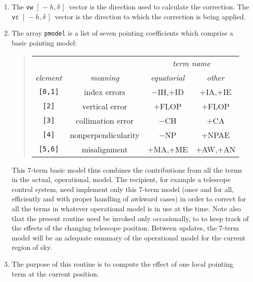 \documentclass[12pt,fleqn,twoside]{article}
\renewcommand{\_}{{\tt\char'137}}     %
\newcommand{\mhadec}     {$[\,-h,\delta\,]$}
\begin{document}
{\begin{enumerate}
\begin{itemize}
      \end{itemize}
\item The {\tt vw} \mhadec\ vector is the direction used to calculate the
      correction.
      The {\tt vc} \mhadec\ vector is the direction to which the correction
      is being applied.
\item The array {\tt pmodel} is a list of seven pointing coefficients
      which comprise a basic pointing model:
      \begin{quote}
      \begin{tabular}{cccc}
      & & \multicolumn{2}{c}{\it term name} \\
      {\it element} & {\it meaning} & {\it equatorial} & {\it other} \\[1ex]
      {\tt [0,1]} & index errors & $-$IH,$+$ID & $+$IA,$+$IE \\
      {\tt [2]} & vertical error & $+$FLOP & $+$FLOP \\
      {\tt [3]} & collimation error & $-$CH & $+$CA \\
      {\tt [4]} & nonperpendicularity & $-$NP & $+$NPAE \\
      {\tt [5,6]} & misalignment & $+$MA,$+$ME & $+$AW,$+$AN \\
      \end{tabular}
      \end{quote}
      This 7-term basic model thus combines the contributions from all
      the terms in the actual, operational, model.  The recipient, for
      example a telescope control system, need implement only this
      7-term model (once and for all, efficiently and with proper
      handling of awkward cases) in order to correct for all the terms
      in whatever operational model is in use at the time.  Note also
      that the present routine need be invoked only occasionally, to
      to keep track of the effects of the changing telescope position.
      Between updates, the 7-term model will be an adequate summary of
      the operational model for the current region of sky.
\item The purpose of this routine is to compute the effect of
      one local pointing term at the current position.


\end{enumerate}}
\end{document}
